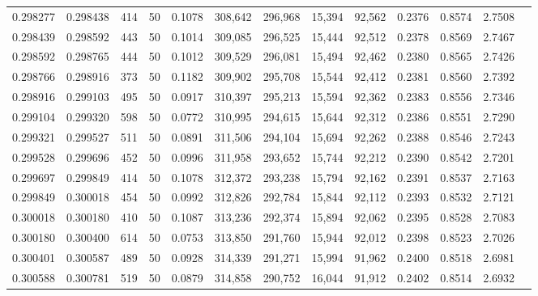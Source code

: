 \begin{tabular}{rrrrrrrrrrrrr}
0.298277 & 0.298438 &   414 &  50 &                                     0.1078 & 308,642 & 296,968 &  15,394 &  92,562 & 0.2376 & 0.8574 & 2.7508 \\
0.298439 & 0.298592 &   443 &  50 &                                     0.1014 & 309,085 & 296,525 &  15,444 &  92,512 & 0.2378 & 0.8569 & 2.7467 \\
0.298592 & 0.298765 &   444 &  50 &                                     0.1012 & 309,529 & 296,081 &  15,494 &  92,462 & 0.2380 & 0.8565 & 2.7426 \\
0.298766 & 0.298916 &   373 &  50 &                                     0.1182 & 309,902 & 295,708 &  15,544 &  92,412 & 0.2381 & 0.8560 & 2.7392 \\
0.298916 & 0.299103 &   495 &  50 &                                     0.0917 & 310,397 & 295,213 &  15,594 &  92,362 & 0.2383 & 0.8556 & 2.7346 \\
0.299104 & 0.299320 &   598 &  50 &                                     0.0772 & 310,995 & 294,615 &  15,644 &  92,312 & 0.2386 & 0.8551 & 2.7290 \\
0.299321 & 0.299527 &   511 &  50 &                                     0.0891 & 311,506 & 294,104 &  15,694 &  92,262 & 0.2388 & 0.8546 & 2.7243 \\
0.299528 & 0.299696 &   452 &  50 &                                     0.0996 & 311,958 & 293,652 &  15,744 &  92,212 & 0.2390 & 0.8542 & 2.7201 \\
0.299697 & 0.299849 &   414 &  50 &                                     0.1078 & 312,372 & 293,238 &  15,794 &  92,162 & 0.2391 & 0.8537 & 2.7163 \\
0.299849 & 0.300018 &   454 &  50 &                                     0.0992 & 312,826 & 292,784 &  15,844 &  92,112 & 0.2393 & 0.8532 & 2.7121 \\
0.300018 & 0.300180 &   410 &  50 &                                     0.1087 & 313,236 & 292,374 &  15,894 &  92,062 & 0.2395 & 0.8528 & 2.7083 \\
0.300180 & 0.300400 &   614 &  50 &                                     0.0753 & 313,850 & 291,760 &  15,944 &  92,012 & 0.2398 & 0.8523 & 2.7026 \\
0.300401 & 0.300587 &   489 &  50 &                                     0.0928 & 314,339 & 291,271 &  15,994 &  91,962 & 0.2400 & 0.8518 & 2.6981 \\
0.300588 & 0.300781 &   519 &  50 &                                     0.0879 & 314,858 & 290,752 &  16,044 &  91,912 & 0.2402 & 0.8514 & 2.6932 \\

\end{tabular}
